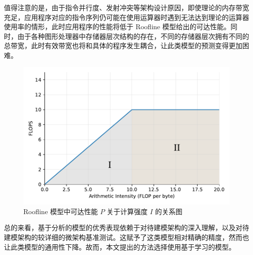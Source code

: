 值得注意的是，由于指令并行度、发射冲突等架构设计原因，即使理论的内存带宽充足，应用程序对应的指令序列仍可能在使用运算器时遇到无法达到理论的运算器使用率的情形，此时应用程序的性能将低于 Roofline 模型给出的可达性能。同时，由于各种图形处理器中存储器层次结构的存在，不同的存储器层次拥有不同的总带宽，此时有效带宽也将和具体的程序发生耦合，让此类模型的预测变得更加困难。

\begin{figure}[h]
  \centering
  \includegraphics[width=1.0\linewidth]{figures/roofline.pdf}
  \caption{Roofline 模型中可达性能 $ P $ 关于计算强度 $ I $ 的关系图}
  \label{fig:roofline_graph}
\end{figure}

总的来看，基于分析的模型的优秀表现依赖于对待建模架构的深入理解，以及对待建模架构的较详细的微架构基准测试。这赋予了这类模型相对精确的精度，然而也让此类模型的通用性下降。故而，本文提出的方法选择使用基于学习的模型。



